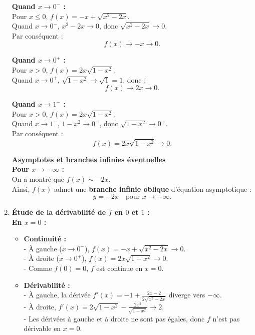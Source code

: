 \documentclass{article}
\begin{document}
\begin{enumerate}
    \textbf{Quand \( x \to 0^- \) :} \\
    Pour \( x \leq 0 \), \( f(x) = -x + \sqrt{x^2 - 2x} \). \\
    Quand \( x \to 0^- \), \( x^2 - 2x \to 0 \), donc \( \sqrt{x^2 - 2x} \to 0 \). \\
    Par conséquent :
    \[
    f(x) \to -x \to 0.
    \]

    \textbf{Quand \( x \to 0^+ \) :} \\
    Pour \( x > 0 \), \( f(x) = 2x\sqrt{1 - x^2} \). \\
    Quand \( x \to 0^+ \), \( \sqrt{1 - x^2} \to \sqrt{1} = 1 \), donc :
    \[
    f(x) \to 2x \to 0.
    \]

    \textbf{Quand \( x \to 1^- \) :} \\
    Pour \( x > 0 \), \( f(x) = 2x\sqrt{1 - x^2} \). \\
    Quand \( x \to 1^- \), \( 1 - x^2 \to 0^+ \), donc \( \sqrt{1 - x^2} \to 0^+ \). \\
    Par conséquent :
    \[
    f(x) = 2x\sqrt{1 - x^2} \to 0.
    \]
   
    \textbf{Asymptotes et branches infinies éventuelles} \\

    \textbf{Pour \( x \to -\infty \) :} \\
    On a montré que \( f(x) \sim -2x \). \\
    Ainsi, \( f(x) \) admet une \textbf{branche infinie oblique} d'équation asymptotique :
    \[
    y = -2x \quad \text{pour } x \to -\infty.
    \]
    
    \item \textbf{Étude de la dérivabilité de \( f \) en \( 0 \) et \( 1 \) :} \\

    \textbf{En \( x = 0 \) :}
    \begin{itemize}
        \item \textbf{Continuité :} \\
        - À gauche (\( x \to 0^- \)), \( f(x) = -x + \sqrt{x^2 - 2x} \to 0 \). \\
        - À droite (\( x \to 0^+ \)), \( f(x) = 2x\sqrt{1 - x^2} \to 0 \). \\
        - Comme \( f(0) = 0 \), \( f \) est continue en \( x = 0 \).

        \item \textbf{Dérivabilité :} \\
        - À gauche, la dérivée \( f'(x) = -1 + \frac{2x - 2}{2\sqrt{x^2 - 2x}} \) diverge vers \(-\infty\). \\
        - À droite, \( f'(x) = 2\sqrt{1 - x^2} - \frac{2x^2}{\sqrt{1 - x^2}} \to 2 \). \\
        - Les dérivées à gauche et à droite ne sont pas égales, donc \( f \) n'est pas dérivable en \( x = 0 \).
    \end{itemize}


\end{enumerate}
\end{document}
